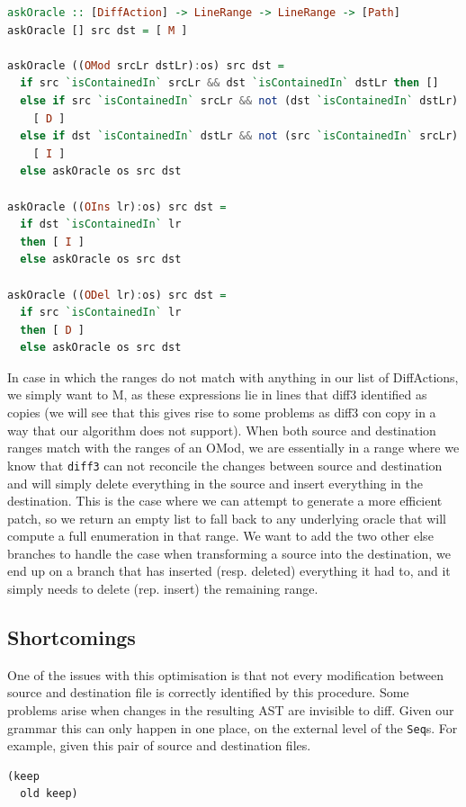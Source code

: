 \documentclass[11pt]{article}
\begin{document}
\begin{lstlisting}[language=haskell]
askOracle :: [DiffAction] -> LineRange -> LineRange -> [Path]
askOracle [] src dst = [ M ]

askOracle ((OMod srcLr dstLr):os) src dst =
  if src `isContainedIn` srcLr && dst `isContainedIn` dstLr then []
  else if src `isContainedIn` srcLr && not (dst `isContainedIn` dstLr) then
    [ D ]
  else if dst `isContainedIn` dstLr && not (src `isContainedIn` srcLr) then
    [ I ]
  else askOracle os src dst

askOracle ((OIns lr):os) src dst =
  if dst `isContainedIn` lr
  then [ I ]
  else askOracle os src dst

askOracle ((ODel lr):os) src dst =
  if src `isContainedIn` lr
  then [ D ]
  else askOracle os src dst
\end{lstlisting}

In case in which the ranges do 
not match with anything in our list of DiffActions, we simply want to M, as 
these expressions lie in lines that diff3 identified as copies (we will see that this gives rise to some problems
as diff3 con copy in a way that our algorithm does not support). When both 
source and destination ranges match with the ranges of an OMod, we are essentially in a range where
we know that \texttt{diff3} can not reconcile the changes between source and destination 
and will simply delete everything in the source and insert everything in the 
destination. This is the case where we can attempt to generate a more efficient 
patch, so we return an empty list to fall back to any underlying oracle that 
will compute a full enumeration in that range. We want to add the two other else 
branches to handle the case when transforming a source into the destination, we 
end up on a branch that has inserted (resp. deleted) everything it had to, and 
it simply needs to delete (rep. insert) the remaining range.

\subsection{Shortcomings}
One of the issues with this optimisation is that not every modification between 
source and destination file is correctly identified by this procedure. Some 
problems arise when changes in the resulting AST are invisible to diff. Given 
our grammar this can only happen in one place, on the external level of the 
\texttt{Seq}s. For example, given this pair of source and destination files.
\begin{lstlisting}[language=haskell]
(keep
  old keep)
\end{lstlisting}
\end{document}
